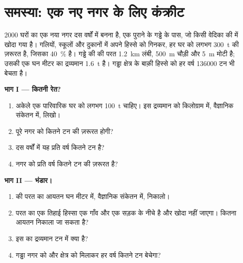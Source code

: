 \section{समस्या: एक नए नगर के लिए कंक्रीट}

\begin{problem}
\label{pb:g9:earth-resources:1}
\num{2000} घरों का एक नया नगर दस वर्षों में बनना है, एक पुराने  के गड्ढे के पास, जो
किसी  वेदिका की  में खोदा गया है। गलियों, स्कूलों और दुकानों में अपने हिस्से को गिनकर,
हर घर को लगभग \qty{300}{t}  की ज़रूरत है, जिसका \qty{40}{\%}  है। गड्ढे की
 की परत \qty{1.2}{km} लंबी, \qty{500}{m} चौड़ी और \qty{5}{m} मोटी है; उसकी एक
घन मीटर  का द्रव्यमान \qty{1.6}{t} है। गड्ढा क्षेत्र के बाक़ी हिस्से को हर वर्ष
\num{136000} टन  भी बेचता
है।

\noindent\textbf{भाग I --- कितनी रेत?}\par\nopagebreak
\begin{enumerate}[beginpenalty=10000]
  \item अकेले एक पारिवारिक घर को लगभग \qty{100}{t}  चाहिए। इस द्रव्यमान को
        किलोग्राम में, वैज्ञानिक संकेतन में, लिखो।
  \item पूरे नगर को कितने टन  की ज़रूरत होगी?
  \item दस वर्षों में यह प्रति वर्ष कितने टन है?
  \item नगर को प्रति वर्ष कितने टन  की ज़रूरत है?
\end{enumerate}

\noindent\textbf{भाग II --- भंडार।}\par\nopagebreak
\begin{enumerate}[resume, beginpenalty=10000]
  \item {} की परत का आयतन घन मीटर में, वैज्ञानिक संकेतन में,
        निकालो।
  \item परत का एक तिहाई हिस्सा एक गाँव और एक सड़क के नीचे है और खोदा नहीं जाएगा।
        कितना आयतन निकाला जा सकता है?
  \item इस  का द्रव्यमान टन में क्या है?
  \item गड्ढा नगर को और क्षेत्र को मिलाकर हर वर्ष कितने टन  बेचेगा?
\end{enumerate}


\end{problem}
